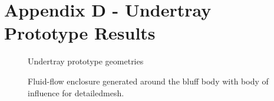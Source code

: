 \newpage
\flushleft
\section*{Appendix D - Undertray Prototype Results} 

\begin{figure}[!htb]
    \centering
    \noindent{}
    \caption{Undertray prototype geometries}
    \label{fig:UTP_D}
\end{figure}

\begin{figure}[!htb]
    \centering
    \noindent{}
    \caption{Fluid-flow enclosure generated around the bluff body with body of influence for detailedmesh.}
    \label{fig:UTP_Fluid_flow}
\end{figure}